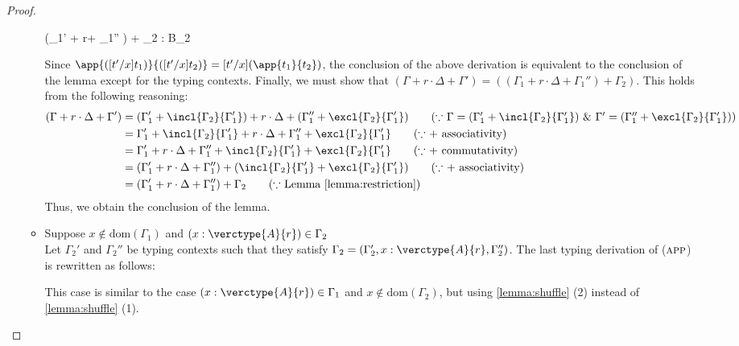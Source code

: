\begin{proof}
\begin{itemize}
\begin{itemize}
\begin{center}
\begin{minipage}{.85\linewidth}
{        }{
             (\Gamma_1' + r\cdot\Delta + \Gamma_1'' ) + \Gamma_2 \vdash {} : B_2
        }
    \end{minipage}
\end{center}
Since $\app{([t'/x]t_1)}{([t'/x]t_2)}=[t'/x](\app{t_1}{t_2})$, the conclusion of the above derivation
is equivalent to the conclusion of the lemma except for the typing contexts.
Finally, we must show that $(\Gamma + r\cdot\Delta + \Gamma') = ((\Gamma_1 + r\cdot\Delta + \Gamma_1'') + \Gamma_2)$.
This holds from the following reasoning:
\begin{align*}
(\Gamma + r\cdot\Delta + \Gamma')
    &= (\Gamma_1' + \incl{\Gamma_2}{\Gamma_1'}) + r\cdot\Delta + (\Gamma_1'' + \excl{\Gamma_2}{\Gamma_1'})\tag{$\because$ $\Gamma = (\Gamma_1' + \incl{\Gamma_2}{\Gamma_1'})$ \& $\Gamma' = (\Gamma_1'' + \excl{\Gamma_2}{\Gamma_1'})$}\\
    &= \Gamma_1' + \incl{\Gamma_2}{\Gamma_1'} + r\cdot\Delta + \Gamma_1'' + \excl{\Gamma_2}{\Gamma_1'}\tag{$\because$ $+$ associativity}\\
    &= \Gamma_1' + r\cdot\Delta + \Gamma''_1 + \incl{\Gamma_2}{\Gamma_1'} + \excl{\Gamma_2}{\Gamma_1'}\tag{$\because$ $+$ commutativity}\\
    &= (\Gamma_1' + r\cdot\Delta + \Gamma''_1) + (\incl{\Gamma_2}{\Gamma_1'} + \excl{\Gamma_2}{\Gamma_1'})\tag{$\because$ $+$ associativity}\\
    &= (\Gamma_1' + r\cdot\Delta + \Gamma''_1) + \Gamma_2\tag{$\because$ Lemma \ref{lemma:restriction}}
\end{align*}
Thus, we obtain the conclusion of the lemma.

\item Suppose $x \notin \mathrm{dom}(\Gamma_1)$ and $(x:\verctype{A}{r}) \in \Gamma_2$\\
Let $\Gamma_2'$ and $\Gamma_2''$ be typing contexts such that they satisfy $\Gamma_2 = (\Gamma_2', x:\verctype{A}{r}, \Gamma_2'')$.
The last typing derivation of ($\textsc{app}$) is rewritten as follows:
\begin{center}
    \begin{minipage}{.8\linewidth}
    \end{minipage}
\end{center}
This case is similar to the case $(x:\verctype{A}{r})\in \Gamma_1$ and $x \notin \mathrm{dom}(\Gamma_2)$, but using \ref{lemma:shuffle} (2) instead of \ref{lemma:shuffle} (1).\\


\end{itemize}
\end{itemize}
\end{proof}
